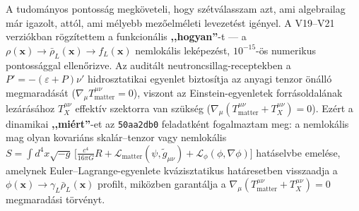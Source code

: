 \documentclass[10pt,a4paper]{article}
\begin{document}
\par
A tudom\'anyos pontoss\'ag megk\"oveteli, hogy sz\'etv\'alasszam azt, ami algebrailag m\'ar igazolt, att\'ol, ami m\'elyebb mez\H{o}elm\'eleti levezet\'est ig\'enyel. A V19--V21 verzi\'okban r\"ogz\'itettem a funkcion\'alis \textbf{,,hogyan''}-t --- a $\rho(\mathbf{x}) \to \bar{\rho}_L(\mathbf{x}) \to f_L(\mathbf{x})$ nemlok\'alis lek\'epez\'est, $10^{-15}$-\"os numerikus pontoss\'aggal ellen\H{o}rizve. Az audit\'alt neutroncsillag-receptekben a $P' = -(\varepsilon+P)\nu'$ hidrosztatikai egyenlet biztos\'itja az anyagi tenzor \"on\'all\'o megmarad\'as\'at ($\nabla_\mu T^{\mu\nu}_{\text{matter}} = 0$), viszont az Einstein-egyenletek forr\'asoldal\'anak lez\'ar\'as\'ahoz $T^{\mu\nu}_X$ effekt\'iv szektorra van sz\"uks\'eg ($\nabla_\mu(T^{\mu\nu}_{\text{matter}} + T^{\mu\nu}_X) = 0$). Ez\'ert a dinamikai \textbf{,,mi\'ert''}-et az \texttt{50aa2db0} feladatk\'ent fogalmaztam meg: a nemlok\'alis mag olyan kovari\'ans skal\'ar--tenzor vagy nemlok\'alis $S = \int d^4x\sqrt{-g}\,\bigl[\frac{c^4}{16\pi G}R + \mathcal{L}_{\text{matter}}(\psi, \tilde{g}_{\mu\nu}) + \mathcal{L}_\phi(\phi,\nabla\phi)\bigr]$ hat\'aselvbe emel\'ese, amelynek Euler--Lagrange-egyenlete kv\'azisztatikus hat\'aresetben visszaadja a $\phi(\mathbf{x}) \to \gamma_L\bar{\rho}_L(\mathbf{x})$ profilt, mik\"ozben garant\'alja a $\nabla_\mu(T^{\mu\nu}_{\text{matter}} + T^{\mu\nu}_X) = 0$ megmarad\'asi t\"orv\'enyt.
\end{document}

